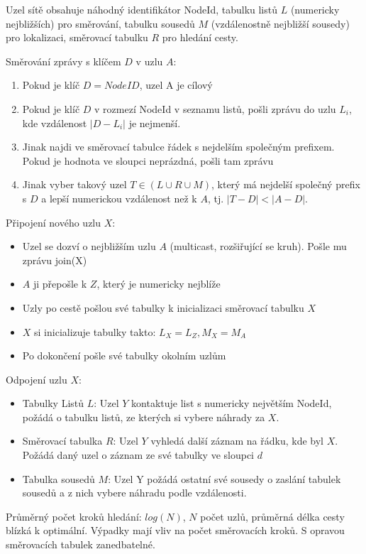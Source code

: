 \documentclass[a4paper, 11pt]{report}
\begin{document}
Uzel sítě obsahuje náhodný identifikátor NodeId, tabulku listů $L$ (numericky nejbližších) pro směrování, tabulku sousedů $M$ (vzdálenostně nejbližší sousedy) pro lokalizaci, směrovací tabulku $R$ pro hledání cesty.

Směrování zprávy s klíčem $D$ v uzlu $A$:
\begin{enumerate}
	\item Pokud je klíč $D = NodeID$, uzel A je cílový
	\item Pokud je klíč $D$ v rozmezí NodeId v seznamu listů, pošli zprávu do uzlu $L_i$, kde vzdálenost $|D-L_i|$ je nejmenší.
	\item Jinak najdi ve směrovací tabulce řádek s nejdelším společným prefixem. Pokud je hodnota ve sloupci neprázdná, pošli tam zprávu
	\item Jinak vyber takový uzel $T \in (L \cup R \cup M)$, který má nejdelší společný prefix s $D$ a lepší numerickou vzdálenost než k $A$, tj. $|T-D| < |A-D|$.
\end{enumerate}
Připojení nového uzlu $X$:
\begin{itemize}
	\item Uzel se dozví o nejbližším uzlu $A$ (multicast, rozšiřující se kruh). Pošle mu zprávu join(X)
	\item $A$ ji přepošle k $Z$, který je numericky nejblíže
	\item Uzly po cestě pošlou své tabulky k inicializaci směrovací tabulku $X$
	\item $X$ si inicializuje tabulky takto: $L_X = L_Z, M_X = M_A$
	\item Po dokončení pošle své tabulky okolním uzlům
\end{itemize}
Odpojení uzlu $X$:
\begin{itemize}
	\item Tabulky Listů $L$: Uzel $Y$ kontaktuje list s numericky největším NodeId, požádá o tabulku listů, ze kterých si vybere náhrady za $X$.
	\item Směrovací tabulka $R$: Uzel $Y$ vyhledá další záznam na řádku, kde byl $X$. Požádá daný uzel o záznam ze své tabulky ve sloupci $d$
	\item Tabulka sousedů $M$: Uzel Y požádá ostatní své sousedy o zaslání tabulek sousedů a z nich vybere náhradu podle vzdálenosti.
\end{itemize}
Průměrný počet kroků hledání: $log(N)$, $N$ počet uzlů, průměrná délka cesty blízká k optimální. Výpadky mají vliv na počet směrovacích kroků. S opravou směrovacích tabulek zanedbatelné.
\end{document}
